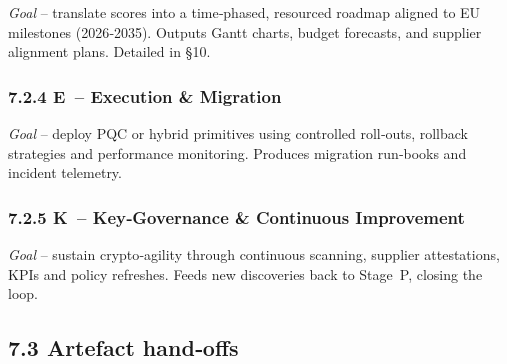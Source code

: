 \documentclass[
  english,
]{article}
\begin{document}
\emph{Goal} -- translate scores into a time‑phased, resourced roadmap
aligned to EU milestones (2026‑2035). Outputs Gantt charts, budget
forecasts, and supplier alignment plans. Detailed in §10.

\subsubsection{\texorpdfstring{7.2.4 \textbf{E~-- Execution \&
Migration}}{7.2.4 E~-- Execution \& Migration}}\label{e-execution-migration}

\emph{Goal} -- deploy PQC or hybrid primitives using controlled
roll‑outs, rollback strategies and performance monitoring. Produces
migration run‑books and incident telemetry.

\subsubsection{\texorpdfstring{7.2.5 \textbf{K~-- Key‑Governance \&
Continuous
Improvement}}{7.2.5 K~-- Key‑Governance \& Continuous Improvement}}\label{k-keygovernance-continuous-improvement}

\emph{Goal} -- sustain crypto‑agility through continuous scanning,
supplier attestations, KPIs and policy refreshes. Feeds new discoveries
back to Stage~P, closing the loop.

\subsection{7.3 Artefact hand‑offs}\label{artefact-handoffs}
\end{document}
